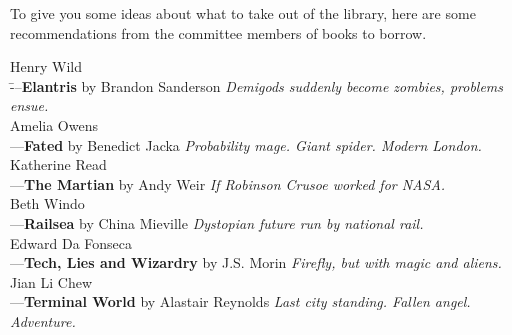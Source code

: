 To give you some ideas about what to take out of the library, here are some recommendations from the committee members of books to borrow. 

\par\vspace{-1em}
\parbox{0.4\textwidth}{
\begin{tabbing}
Henry Wild\\ \quad\=---\quad \textbf{Elantris} by Brandon Sanderson \textit{Demigods suddenly become zombies, problems ensue.}\\
Amelia Owens \\ \>---\quad \textbf{Fated} by Benedict Jacka \textit{Probability mage. Giant spider. Modern London.}\\
Katherine Read\\ \>---\quad \textbf{The Martian} by Andy Weir \textit{If Robinson Crusoe worked for NASA.}\\
Beth Windo\\ \>---\quad \textbf{Railsea} by China Mieville \textit{Dystopian future run by national rail.}\\
Edward Da Fonseca\\ \>---\quad \textbf{Tech, Lies and Wizardry} by J.S. Morin \textit{Firefly, but with magic and aliens.}\\
Jian Li Chew\\ \>---\quad \textbf{Terminal World} by Alastair Reynolds \textit{ Last city standing. Fallen angel. Adventure.}\\
\end{tabbing}
}
